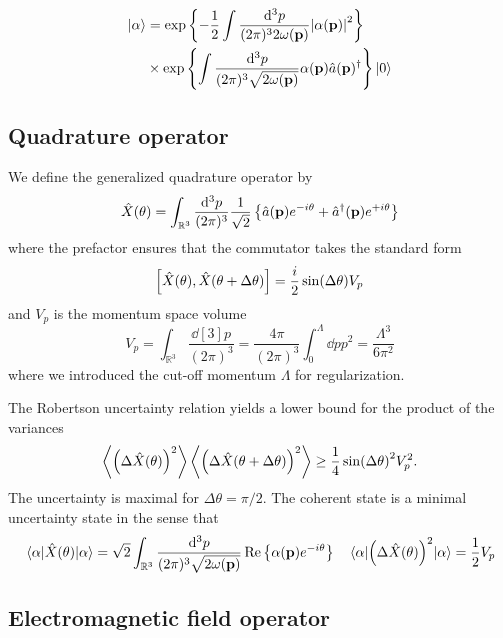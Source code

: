 \begin{equation}
	\begin{split}
		\ket{\alpha}
		&=
		\exp\left\{
			-
			\frac{1}{2}
			\int\frac{\dd[3]{p}}{(2\pi)^32\omega(\vb{p})}
			\abs{\alpha(\vb{p})}^2
		\right\}
		\\
		&\times
		\exp\left\{
			\int\frac{\dd[3]{p}}{(2\pi)^3\sqrt{2\omega(\vb{p})}}
			\alpha(\vb{p})
			\hat{a}(\vb{p})^\dagger
		\right\}
		\ket{0}
	\end{split}
\end{equation}

\subsection{Quadrature operator}

We define the generalized quadrature operator by 
\begin{equation}
	\hat{X}(\theta)
	=
	\int_{\mathbb{R}^3}
	\frac{\dd[3]{p}}{(2\pi)^3}
	\frac{1}{\sqrt{2}}
	\left\{
		\hat{a}(\vb{p})
		e^{-i\theta}
		+
		\hat{a}^\dagger(\vb{p})
		e^{+i\theta}
	\right\}
\end{equation}
where the prefactor ensures that the commutator takes the standard form
\begin{equation}
	\comm{\hat{X}(\theta)}{\hat{X}(\theta+\Delta\theta)}
	=
	\frac{i}{2}
	\sin(\Delta\theta)
	V_p
\end{equation}
and $V_p$ is the momentum space volume
\begin{equation}
	V_p
	=
	\int_{\mathbb{R}^3}\frac{\dd[3]{p}}{(2\pi)^3}
	=
	\frac{4\pi}{(2\pi)^3}
	\int_0^\Lambda\dd{p}p^2
	=
	\frac{\Lambda^3}{6\pi^2}
\end{equation}
where we introduced the cut-off momentum $\Lambda$ for regularization.

The Robertson uncertainty relation yields a lower bound for the product of the variances
\begin{equation}
	\expval{\left(\Delta\hat{X}(\theta)\right)^2}
	\expval{\left(\Delta\hat{X}(\theta+\Delta\theta)\right)^2}
	\geq
	\frac{1}{4}
	\sin(\Delta\theta)^2
	V_p^2
	.
\end{equation}
The uncertainty is maximal for $\Delta\theta=\pi/2$.
The coherent state is a minimal uncertainty state in the sense that
\begin{align}
	\expval{\hat{X}(\theta)}{\alpha}
	=
	\sqrt{2}
	\int_{\mathbb{R}^3}
	\frac{\dd[3]{p}}{(2\pi)^3\sqrt{2\omega(\vb{p})}}
	\operatorname{\operatorname{Re}}\left\{
		\alpha(\vb{p})
		e^{-i\theta}
	\right\}
	&&
	\expval{\left(\Delta\hat{X}(\theta)\right)^2}{\alpha}
	=
	\frac{1}{2}
	V_p
\end{align}

\subsection{Electromagnetic field operator}